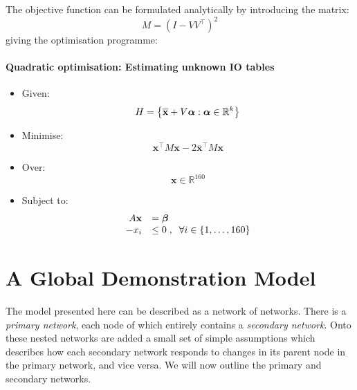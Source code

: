 \documentclass[preprint,authoryear,3p]{elsarticle}
\begin{document}
The objective function can be formulated analytically by introducing the matrix:
$$M = (I - V V^\top)^2$$
giving the optimisation programme:

\paragraph*{Quadratic optimisation: Estimating unknown IO tables}
\begin{itemize}
\item Given: $$ H = \left\{ \overline{\textbf{x}} + V \mbox{\boldmath$\alpha$} : \mbox{\boldmath$\alpha$} \in \mathbb{R}^{k} \right\} $$
\item Minimise: $$\textbf{x}^\top M \textbf{x} - 2 \overline{\textbf{x}}^\top M \textbf{x}$$
\item Over: $$\textbf{x} \in \mathbb{R}^{160}$$
\item Subject to:
\begin{align*}
\begin{array}{rl}
A \textbf{x} & = \mbox{\boldmath$\beta$} \\
-x_{i} & \leq 0 \; , \; \; \forall i \in \{ 1, \mathellipsis, 160 \}
\end{array}
\end{align*}
\end{itemize}



\newpage





\section{A Global Demonstration Model}
The model presented here can be described as a network of networks. There is a \textit{primary network}, each node of which entirely contains a \textit{secondary network}. Onto these nested networks are added a small set of simple assumptions which describes how each secondary network responds to changes in its parent node in the primary network, and vice versa. We will now outline the primary and secondary networks.
\end{document}
